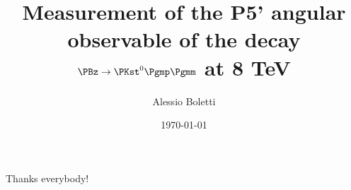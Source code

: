 \documentclass[12pt,oneside,a4paper]{report}
\title{Measurement of the P5' angular observable of  the decay \texorpdfstring{$\PBz\to\PKst^0\Pgmp\Pgmm$}{B0->K*mumu} at 8 TeV}
\author[pdinfn,pduni]{Alessio Boletti}
\date{\today}
\begin{document}
\maketitle %

\tableofcontents
\clearpage


\clearpage


\begin{acknowledgments}

Thanks everybody!
\end{acknowledgments}


\end{document}
